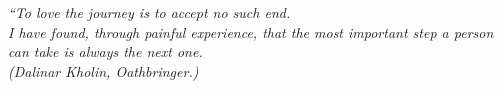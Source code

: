 \documentclass[pretext-section.tex]{subfiles}
\begin{document}
\begin{epigrafe}
    \vspace*{\fill}
	\begin{flushright}
		\textit{``To love the journey is to accept no such end. \\
		I have found, through painful experience, that the most important step 
		a person can take is always the next one.\\
		(Dalinar Kholin, Oathbringer.)}
	\end{flushright}
\end{epigrafe}
\end{document}
